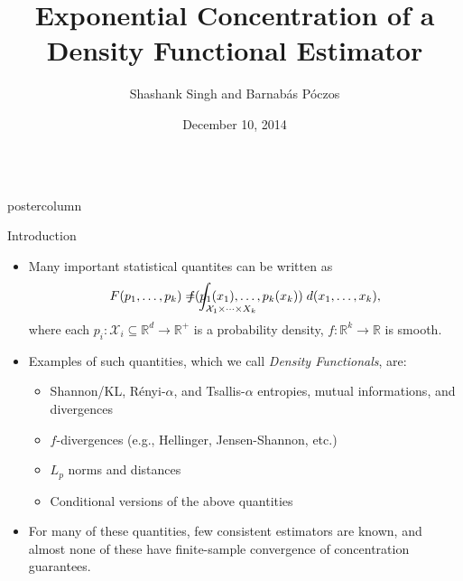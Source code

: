 \documentclass[final,hyperref={pdfpagelabels=false}]{beamer}
\title{\Large Exponential Concentration of a Density Functional Estimator}
\author{Shashank Singh and Barnab\'as P\'oczos}
\institute[Carnegie Mellon University]{Machine Learning Department,
                            Carnegie Mellon University, Pittsburgh, PA, USA}
\date[December 10, 2014]{December 10, 2014}
\newcommand{\R}{\mathbb{R}}
\newcommand{\X}{\mathcal{X}}
\newlength{\columnheight}
\begin{document}
\begin{frame}
  \begin{columns}
    \begin{column}{.32\textwidth}
      \begin{beamercolorbox}[center,wd=\textwidth]{postercolumn}
        \begin{minipage}[T]{.95\textwidth}  %
          \parbox[t][\columnheight]{\textwidth}{ %
            \vfill
            \begin{block}{Introduction}
              \begin{itemize}
              \item Many important statistical quantites can be written as
                    \[F(p_1,\dots,p_k)
                        = \int_{\X_1 \times \cdots \times X_k} \hspace{-20mm}
                            f(p_1(x_1),\dots,p_k(x_k)) \; d(x_1,\dots,x_k),\]
                    where each $p_i: \X_i \subseteq \R^d \to \R^+$ is a
                    probability density, $f : \R^k \to \R$ is smooth.
              \item Examples of such quantities, which we call
                    \emph{Density Functionals}, are:
                    \begin{itemize}
                    \item Shannon/KL, R\'enyi-$\alpha$, and Tsallis-$\alpha$
                    entropies, mutual informations, and divergences
                    \item $f$-divergences (e.g., Hellinger, Jensen-Shannon,
                    etc.)
                    \item $L_p$ norms and distances
                    \item Conditional versions of the above quantities
                    \end{itemize}
              \item For many of these quantities, few consistent estimators are
                    known, and almost none of these have finite-sample
                    convergence of concentration guarantees.

\end{itemize}
\end{block}}
\end{minipage}
\end{beamercolorbox}
\end{column}
\end{columns}
\end{frame}
\end{document}
